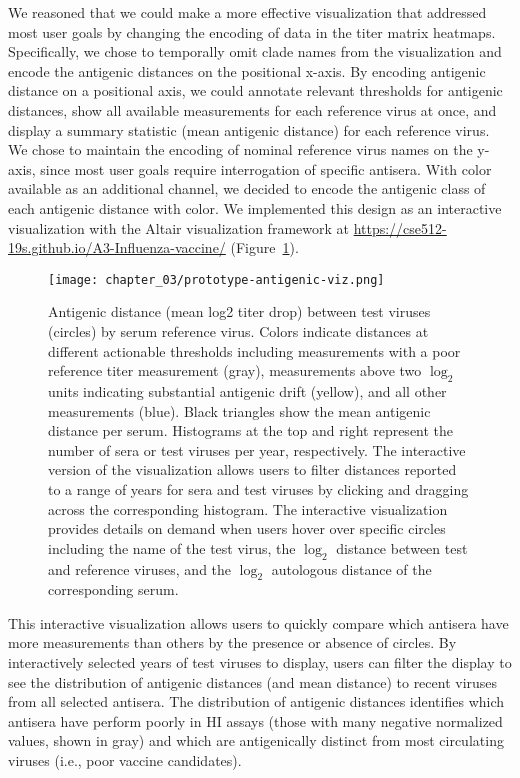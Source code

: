 We reasoned that we could make a more effective visualization that addressed most user goals by changing the encoding of data in the titer matrix heatmaps.
Specifically, we chose to temporally omit clade names from the visualization and encode the antigenic distances on the positional x-axis.
By encoding antigenic distance on a positional axis, we could annotate relevant thresholds for antigenic distances, show all available measurements for each reference virus at once, and display a summary statistic (mean antigenic distance) for each reference virus.
We chose to maintain the encoding of nominal reference virus names on the y-axis, since most user goals require interrogation of specific antisera.
With color available as an additional channel, we decided to encode the antigenic class of each antigenic distance with color.
We implemented this design as an interactive visualization with the Altair visualization framework \citep{VanderPlas2018} at \url{https://cse512-19s.github.io/A3-Influenza-vaccine/} (Figure~\ref{fig:prototype-antigenic-viz}).

\begin{figure}
  \centering
  \texttt{[image: chapter\_03/prototype-antigenic-viz.png]}
  \caption{\label{fig:prototype-antigenic-viz} Antigenic distance (mean log2 titer drop) between test viruses (circles) by serum reference virus.
    Colors indicate distances at different actionable thresholds including measurements with a poor reference titer measurement (gray), measurements above two $\log_{2}$ units indicating substantial antigenic drift (yellow), and all other measurements (blue).
    Black triangles show the mean antigenic distance per serum.
    Histograms at the top and right represent the number of sera or test viruses per year, respectively.
    The interactive version of the visualization allows users to filter distances reported to a range of years for sera and test viruses by clicking and dragging across the corresponding histogram.
    The interactive visualization provides details on demand when users hover over specific circles including the name of the test virus, the $\log_{2}$ distance between test and reference viruses, and the $\log_{2}$ autologous distance of the corresponding serum.
  }
\end{figure}

This interactive visualization allows users to quickly compare which antisera have more measurements than others by the presence or absence of circles.
By interactively selected years of test viruses to display, users can filter the display to see the distribution of antigenic distances (and mean distance) to recent viruses from all selected antisera.
The distribution of antigenic distances identifies which antisera have perform poorly in HI assays (those with many negative normalized values, shown in gray) and which are antigenically distinct from most circulating viruses (i.e., poor vaccine candidates).

